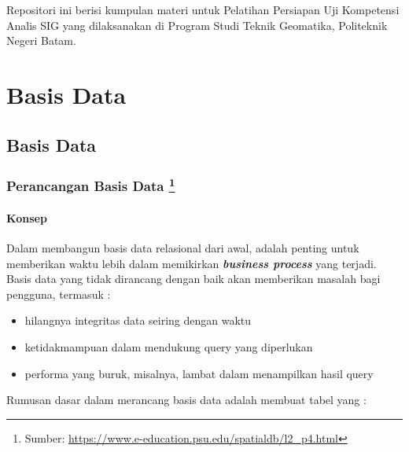 \documentclass[]{book}
\providecommand{\tightlist}{%
  \setlength{\itemsep}{0pt}\setlength{\parskip}{0pt}}
\let\rmarkdownfootnote\footnote%
\def\footnote{\protect\rmarkdownfootnote}
\begin{document}
Repositori ini berisi kumpulan materi untuk Pelatihan Persiapan Uji Kompetensi Analis SIG yang dilaksanakan di Program Studi Teknik Geomatika, Politeknik Negeri Batam.

\hypertarget{part-basis-data}{%
\part{Basis Data}\label{part-basis-data}}

\hypertarget{day2}{%
\chapter{Basis Data}\label{day2}}

\hypertarget{perancangan-basis-data}{%
\section[Perancangan Basis Data ]{\texorpdfstring{Perancangan Basis Data \footnote{Sumber: \url{https://www.e-education.psu.edu/spatialdb/l2_p4.html}}}{Perancangan Basis Data }}\label{perancangan-basis-data}}

\hypertarget{konsep}{%
\subsection{Konsep}\label{konsep}}

Dalam membangun basis data relasional dari awal, adalah penting untuk memberikan waktu lebih dalam memikirkan \textbf{\emph{business process}} yang terjadi. Basis data yang tidak dirancang dengan baik akan memberikan masalah bagi pengguna, termasuk :

\begin{itemize}
\tightlist
\item
  hilangnya integritas data seiring dengan waktu
\item
  ketidakmampuan dalam mendukung query yang diperlukan
\item
  performa yang buruk, misalnya, lambat dalam menampilkan hasil query
\end{itemize}

Rumusan dasar dalam merancang basis data adalah membuat tabel yang :
\end{document}
